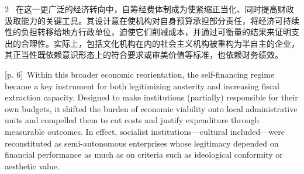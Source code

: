\documentclass[10pt,a4paper]{article}
\begin{document}
\begin{paracol}{2}
\switchcolumn*
{\scriptsize\color{gray} [p. 6]}\ 在这一更广泛的经济转向中，自筹经费体制成为使紧缩正当化、同时提高财政汲取能力的关键工具。其设计意在使机构对自身预算承担部分责任，将经济可持续性的负担转移给地方行政单位，迫使它们削减成本，并通过可衡量的结果来证明支出的合理性。实际上，包括文化机构在内的社会主义机构被重构为半自主的企业，其正当性既依赖意识形态上的符合要求或审美价值等标准，也依赖财务绩效。\par
\switchcolumn
{\scriptsize\color{gray} [p. 6]}\ Within this broader economic reorientation, the self-financing regime became a key instrument for both legitimizing austerity and increasing fiscal extraction capacity. Designed to make institutions (partially) responsible for their own budgets, it shifted the burden of economic viability onto local administrative units and compelled them to cut costs and justify expenditure through measurable outcomes. In effect, socialist institutions—cultural included—were reconstituted as semi-autonomous enterprises whose legitimacy depended on financial performance as much as on criteria such as ideological conformity or aesthetic value.\par
\switchcolumn*

\end{paracol}
\end{document}
